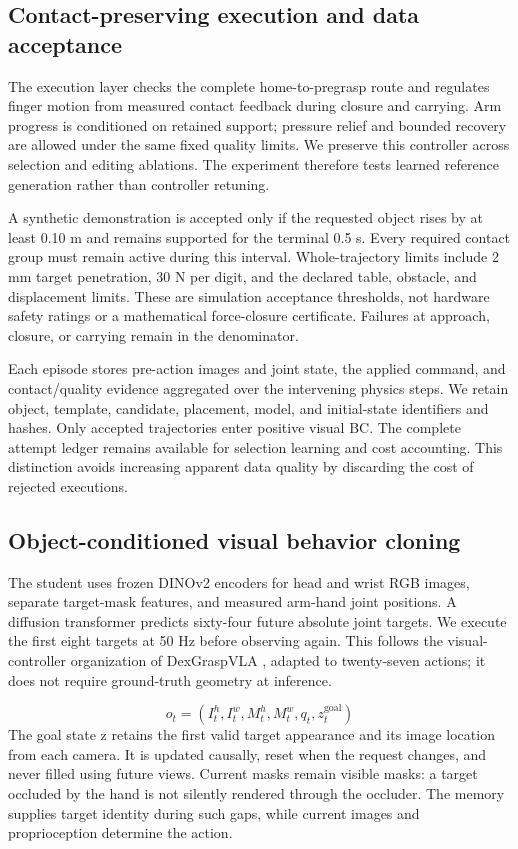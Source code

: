 \documentclass[letterpaper,10pt,conference]{ieeeconf}
\begin{document}
\subsection{Contact-preserving execution and data acceptance}
The execution layer checks the complete home-to-pregrasp route and regulates finger motion from measured contact feedback during closure and carrying. Arm progress is conditioned on retained support; pressure relief and bounded recovery are allowed under the same fixed quality limits. We preserve this controller across selection and editing ablations. The experiment therefore tests learned reference generation rather than controller retuning.

A synthetic demonstration is accepted only if the requested object rises by at least 0.10 m and remains supported for the terminal 0.5 s. Every required contact group must remain active during this interval. Whole-trajectory limits include 2 mm target penetration, 30 N per digit, and the declared table, obstacle, and displacement limits. These are simulation acceptance thresholds, not hardware safety ratings or a mathematical force-closure certificate. Failures at approach, closure, or carrying remain in the denominator.

Each episode stores pre-action images and joint state, the applied command, and contact/quality evidence aggregated over the intervening physics steps. We retain object, template, candidate, placement, model, and initial-state identifiers and hashes. Only accepted trajectories enter positive visual BC. The complete attempt ledger remains available for selection learning and cost accounting. This distinction avoids increasing apparent data quality by discarding the cost of rejected executions.

\subsection{Object-conditioned visual behavior cloning}
The student uses frozen DINOv2 encoders for head and wrist RGB images, separate target-mask features, and measured arm-hand joint positions. A diffusion transformer predicts sixty-four future absolute joint targets. We execute the first eight targets at 50 Hz before observing again. This follows the visual-controller organization of DexGraspVLA \cite{dexgraspvla}, adapted to twenty-seven actions; it does not require ground-truth geometry at inference.

\begin{equation}
o_t=(I_t^h,I_t^w,M_t^h,M_t^w,q_t,z_t^{\mathrm{goal}})
\label{eq:observation}
\end{equation}
The goal state z retains the first valid target appearance and its image location from each camera. It is updated causally, reset when the request changes, and never filled using future views. Current masks remain visible masks: a target occluded by the hand is not silently rendered through the occluder. The memory supplies target identity during such gaps, while current images and proprioception determine the action.
\end{document}
